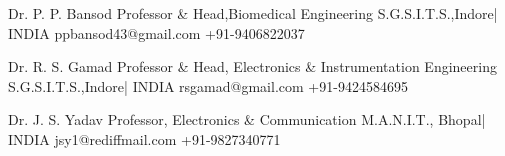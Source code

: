 %
%
%

 {\faQuoteLeft}

\begin{referees}
		{Dr. P. P. Bansod}
		{Professor \& Head,Biomedical Engineering}
		{S.G.S.I.T.S.,Indore| INDIA}
		{ppbansod43@gmail.com}
		{+91-9406822037}
		
		{Dr. R. S. Gamad}
		{Professor \& Head, Electronics \& Instrumentation Engineering}
		{S.G.S.I.T.S.,Indore| INDIA}
		{rsgamad@gmail.com}
		{+91-9424584695}
		
		{Dr. J. S. Yadav}
		{Professor, Electronics  \& Communication}
		{M.A.N.I.T., Bhopal| INDIA}
		{jsy1@rediffmail.com}
		{+91-9827340771}
\end{referees}
